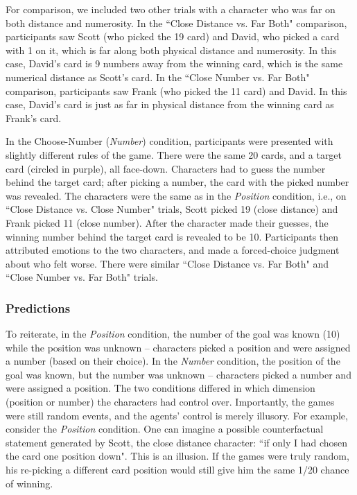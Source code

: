 \documentclass[10pt,letterpaper]{article}
\begin{document}
	For comparison, we included two other trials with a character who was far on both distance and numerosity. In the ``Close Distance vs. Far Both" comparison, participants saw Scott (who picked the 19 card) and David, who picked a card with 1 on it, which is far along both physical distance and numerosity. In this case, David's card is 9 numbers away from the winning card, which is the same numerical distance as Scott's card. In the ``Close Number vs. Far Both" comparison, participants saw Frank (who picked the 11 card) and David. In this case, David's card is just as far in physical distance from the winning card as Frank's card.


	In the Choose-Number (\textit{Number}) condition, participants were presented with slightly different rules of the game. There were the same 20 cards, and a target card (circled in purple), all face-down. Characters had to guess the number behind the target card; after picking a number, the card with the picked number was revealed. The characters were the same as in the \textit{Position} condition, i.e., on ``Close Distance vs. Close Number" trials, Scott picked 19 (close distance) and Frank picked 11 (close number). After the character made their guesses, the winning number behind the target card is revealed to be 10. Participants then attributed emotions to the two characters, and made a forced-choice judgment about who felt worse. There were similar ``Close Distance vs. Far Both" and ``Close Number vs. Far Both" trials.


\subsubsection{Predictions}
	To reiterate, in the \textit{Position} condition, the number of the goal was known (10) while the position was unknown -- characters picked a position and were assigned a number (based on their choice). In the \textit{Number} condition, the position of the goal was known, but the number was unknown -- characters picked a number and were assigned a position. The two conditions differed in which dimension (position or number) the characters had control over. Importantly, the games were still random events, and the agents' control is merely illusory. For example, consider the \textit{Position} condition. One can imagine a possible counterfactual statement generated by Scott, the close distance character: ``if only I had chosen the card one position down". This is an illusion. If the games were truly random, his re-picking a different card position would still give him the same 1/20 chance of winning.
\end{document}

